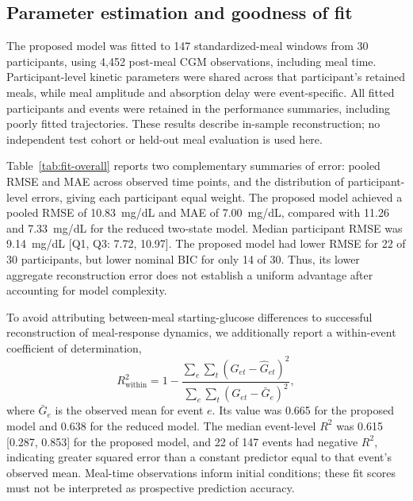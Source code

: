 \subsection{Parameter estimation and goodness of fit}
\label{sec:parameter-estimation-results}

The proposed model was fitted to 147 standardized-meal windows from
30 participants, using 4,452 post-meal CGM observations, including meal
time. Participant-level kinetic parameters were shared across that
participant's retained meals, while meal amplitude and absorption delay
were event-specific. All fitted participants and events were retained in
the performance summaries, including poorly fitted trajectories.
These results describe in-sample reconstruction; no independent
test cohort or held-out meal evaluation is used here.

Table~\ref{tab:fit-overall} reports two complementary summaries of error:
pooled RMSE and MAE across observed time points, and the distribution of
participant-level errors, giving each participant equal weight.
The proposed model achieved a pooled RMSE of 10.83~mg/dL and MAE of
7.00~mg/dL, compared with 11.26 and 7.33~mg/dL for the reduced two-state
model. Median participant RMSE was 9.14~mg/dL [Q1, Q3: 7.72, 10.97].
The proposed model had lower RMSE for 22 of 30 participants, but lower
nominal BIC for only 14 of 30. Thus, its lower aggregate reconstruction
error does not establish a uniform advantage after accounting for
model complexity.

To avoid attributing between-meal starting-glucose differences to
successful reconstruction of meal-response dynamics, we additionally
report a within-event coefficient of determination,
\[
R^2_{\mathrm{within}}
=1-\frac{\sum_e\sum_t(G_{et}-\widehat G_{et})^2}
             {\sum_e\sum_t(G_{et}-\bar G_e)^2},
\]
where $\bar G_e$ is the observed mean for event $e$. Its value was 0.665
for the proposed model and 0.638 for the reduced model. The median
event-level $R^2$ was 0.615 [0.287, 0.853] for the proposed model, and
22 of 147 events had negative $R^2$, indicating greater squared error
than a constant predictor equal to that event's observed mean.
Meal-time observations inform initial conditions; these fit scores
must not be interpreted as prospective prediction accuracy.



